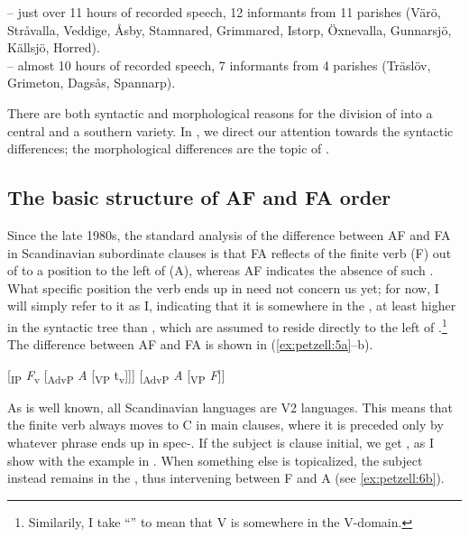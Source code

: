 \documentclass[output=paper,colorlinks,citecolor=brown,draft,draftmode]{langscibook}
\begin{document}
\ea\label{ex:petzell:4}
\ea  {} – just over 11 hours of recorded speech, 12 informants from 11 parishes (Värö, Stråvalla, Veddige, Åsby, Stamnared, Grimmared, Istorp, Öxnevalla, Gunnarsjö, Källsjö, Horred).  \\
\ex\label{ex:petzell:4b}   – almost 10 hours of recorded speech, 7 informants from 4 parishes (Träslöv, Grimeton, Dagsås, Spannarp).
\z
\z


There are both syntactic and morphological reasons for the division of  into a central and a southern variety. In , we direct our attention towards the syntactic differences; the morphological differences are the topic of .


\subsection{The basic structure of AF and FA order}\label{sec:petzell:2.2}


Since the late 1980s, the standard analysis of the difference between AF and FA in Scandinavian subordinate clauses is that FA reflects  of the finite verb (F) out of  to a position to the left of  (A), whereas AF indicates the absence of such . What specific position the verb ends up in need not concern us yet; for now, I will simply refer to it as I, indicating that it is somewhere in the , at least higher in the syntactic tree than , which are assumed to reside directly to the left of .\footnote{Similarily, I take “” to mean that V is somewhere in the V-domain.} The difference between AF and FA is shown in (\ref{ex:petzell:5a}–b).


\ea\label{ex:petzell:5}
\ea\label{ex:petzell:5a}
[\textsubscript{IP} \textit{F}\textsubscript{v} [\textsubscript{AdvP} \textit{A} [\textsubscript{VP} t\textsubscript{v}]]]                      
\ex\label{ex:petzell:5b}{}  [\textsubscript{AdvP} \textit{A} [\textsubscript{VP} \textit{F}]]                        
\z
\z


As is well known, all Scandinavian languages are V2 languages. This means that the finite verb always moves to C in main clauses, where it is preceded only by whatever phrase ends up in spec-. If the subject is clause initial, we get , as I show with the  example in . When something else is topicalized, the subject instead remains in the , thus intervening between F and A (see \ref{ex:petzell:6b}).
\end{document}
